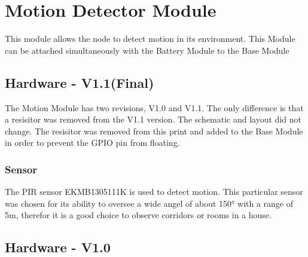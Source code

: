 \section{Motion Detector Module} 

    This module allows the node to detect motion in its environment. This Module can be 
    attached simultaneously with the Battery Module to the Base Module

    \subsection {Hardware - V1.1(Final)}
        The Motion Module has two revisions, V1.0 and V1.1. The only difference is that 
        a resisitor was removed from the V1.1 version. The schematic and layout did not 
        change. The resisitor was removed from this print and added to the Base Module
        in order to prevent the GPIO pin from floating.
        
    \subsubsection{Sensor}
        The PIR sensor EKMB1305111K is used to detect motion. This particular sensor was chosen
        for its ability to oversee a wide angel of about 150° with a range of 5m, therefor it is
        a good choice to observe corridors or rooms in a house.

    \subsection {Hardware - V1.0}